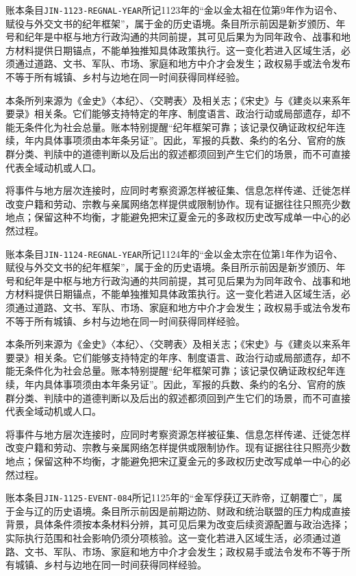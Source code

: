 账本条目\texttt{JIN-1123-REGNAL-YEAR}所记1123年的“金以金太祖在位第9年作为诏令、赋役与外交文书的纪年框架”，属于金的历史语境。条目所示前因是新岁颁历、年号和纪年是中枢与地方行政沟通的共同前提，其可见后果为为同年政令、战事和地方材料提供日期锚点，不能单独推知具体政策执行。这一变化若进入区域生活，必须通过道路、文书、军队、市场、家庭和地方中介才会发生；政权易手或法令发布不等于所有城镇、乡村与边地在同一时间获得同样经验。

本条所列来源为《金史》〈本纪〉、〈交聘表〉及相关志；《宋史》与《建炎以来系年要录》相关条。它们能够支持特定的年序、制度语言、政治行动或局部遗存，却不能无条件化为社会总量。账本特别提醒“纪年框架可靠；该记录仅确证政权纪年连续，年内具体事项须由本年条另证”。因此，军报的兵数、条约的名分、官府的族群分类、判牍中的道德判断以及后出的叙述都须回到产生它们的场景，而不可直接代表全域动机或人口。

将事件与地方层次连接时，应同时考察资源怎样被征集、信息怎样传递、迁徙怎样改变户籍和劳动、宗教与亲属网络怎样提供或限制协作。现有证据往往只照亮少数地点；保留这种不均衡，才能避免把宋辽夏金元的多政权历史改写成单一中心的必然过程。

账本条目\texttt{JIN-1124-REGNAL-YEAR}所记1124年的“金以金太宗在位第1年作为诏令、赋役与外交文书的纪年框架”，属于金的历史语境。条目所示前因是新岁颁历、年号和纪年是中枢与地方行政沟通的共同前提，其可见后果为为同年政令、战事和地方材料提供日期锚点，不能单独推知具体政策执行。这一变化若进入区域生活，必须通过道路、文书、军队、市场、家庭和地方中介才会发生；政权易手或法令发布不等于所有城镇、乡村与边地在同一时间获得同样经验。

本条所列来源为《金史》〈本纪〉、〈交聘表〉及相关志；《宋史》与《建炎以来系年要录》相关条。它们能够支持特定的年序、制度语言、政治行动或局部遗存，却不能无条件化为社会总量。账本特别提醒“纪年框架可靠；该记录仅确证政权纪年连续，年内具体事项须由本年条另证”。因此，军报的兵数、条约的名分、官府的族群分类、判牍中的道德判断以及后出的叙述都须回到产生它们的场景，而不可直接代表全域动机或人口。

将事件与地方层次连接时，应同时考察资源怎样被征集、信息怎样传递、迁徙怎样改变户籍和劳动、宗教与亲属网络怎样提供或限制协作。现有证据往往只照亮少数地点；保留这种不均衡，才能避免把宋辽夏金元的多政权历史改写成单一中心的必然过程。

账本条目\texttt{JIN-1125-EVENT-084}所记1125年的“金军俘获辽天祚帝，辽朝覆亡”，属于金与辽的历史语境。条目所示前因是前期边防、财政和统治联盟的压力构成直接背景，具体条件须按本条材料分辨，其可见后果为改变后续资源配置与政治选择；实际执行范围和社会影响仍须分项核验。这一变化若进入区域生活，必须通过道路、文书、军队、市场、家庭和地方中介才会发生；政权易手或法令发布不等于所有城镇、乡村与边地在同一时间获得同样经验。

